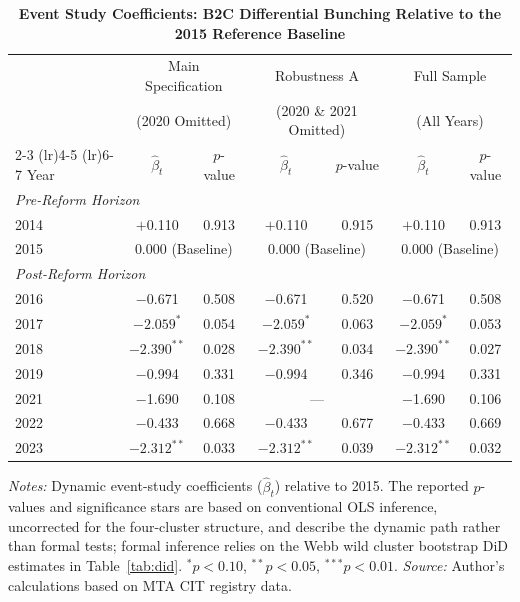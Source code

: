 \documentclass[12pt,oneside,a4paper]{report}
\begin{document}
\begin{table}[H]
\centering
\caption{\textbf{Event Study Coefficients: B2C Differential Bunching
         Relative to the 2015 Reference Baseline}}
\label{tab:event_study}
\begin{threeparttable}
\setlength{\tabcolsep}{0pt}
\small
\begin{tabular*}{\linewidth}{l@{\extracolsep{\fill}}cccccc}
\toprule
 & \multicolumn{2}{c}{Main Specification}
 & \multicolumn{2}{c}{Robustness A}
 & \multicolumn{2}{c}{Full Sample} \\
 & \multicolumn{2}{c}{(2020 Omitted)}
 & \multicolumn{2}{c}{(2020 \& 2021 Omitted)}
 & \multicolumn{2}{c}{(All Years)} \\
\cmidrule(lr){2-3} \cmidrule(lr){4-5} \cmidrule(lr){6-7}
Year & $\hat{\beta}_t$ & $p$-value & $\hat{\beta}_t$ & $p$-value & $\hat{\beta}_t$ & $p$-value \\
\midrule
\multicolumn{7}{l}{\textit{Pre-Reform Horizon}} \\[2pt]
2014 & $+$0.110 & 0.913 & $+$0.110 & 0.915 & $+$0.110 & 0.913 \\
2015 & \multicolumn{2}{c}{0.000\; (Baseline)} & \multicolumn{2}{c}{0.000\; (Baseline)} & \multicolumn{2}{c}{0.000\; (Baseline)} \\
\midrule
\multicolumn{7}{l}{\textit{Post-Reform Horizon}} \\[2pt]
2016 & $-$0.671 & 0.508 & $-$0.671 & 0.520 & $-$0.671 & 0.508 \\
2017 & $-2.059^{*}$ & 0.054 & $-2.059^{*}$ & 0.063 & $-2.059^{*}$ & 0.053 \\
2018 & $-2.390^{**}$ & 0.028 & $-2.390^{**}$ & 0.034 & $-2.390^{**}$ & 0.027 \\
2019 & $-$0.994 & 0.331 & $-$0.994 & 0.346 & $-$0.994 & 0.331 \\
2021 & $-$1.690 & 0.108 & \multicolumn{2}{c}{---} & $-$1.690 & 0.106 \\
2022 & $-$0.433 & 0.668 & $-$0.433 & 0.677 & $-$0.433 & 0.669 \\
2023 & $-2.312^{**}$ & 0.033 & $-2.312^{**}$ & 0.039 & $-2.312^{**}$ & 0.032 \\
\bottomrule
\end{tabular*}
\begin{tablenotes}\footnotesize
\item \textit{Notes:} Dynamic event-study coefficients ($\hat{\beta}_t$) relative to 2015. The reported $p$-values and significance stars are based on conventional OLS inference, uncorrected for the four-cluster structure, and describe the dynamic path rather than formal tests; formal inference relies on the Webb wild cluster bootstrap DiD estimates in Table~\ref{tab:did}. $^{*}p<0.10$, $^{**}p<0.05$, $^{***}p<0.01$.
\textit{Source:} Author's calculations based on MTA CIT registry data.
\end{tablenotes}
\end{threeparttable}
\end{table}
\end{document}
